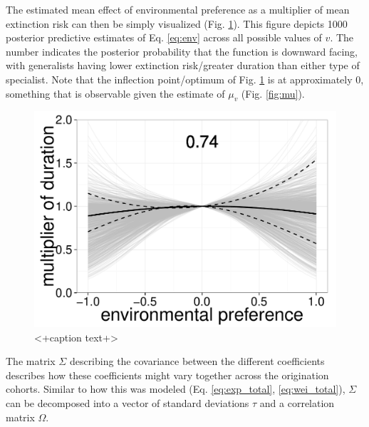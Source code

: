 \documentclass[12pt,letterpaper]{article}
\begin{document}
The estimated mean effect of environmental preference as a multiplier of mean extinction risk can then be simply visualized (Fig. \ref{fig:env_mean}). This figure depicts 1000 posterior predictive estimates of Eq. \ref{eq:env} across all possible values of \(v\). The number indicates the posterior probability that the function is downward facing, with generalists having lower extinction risk/greater duration than either type of specialist. Note that the inflection point/optimum of Fig. \ref{fig:env_mean} is at approximately 0, something that is observable given the estimate of \(\mu_{v}\) (Fig. \ref{fig:mu}).
\begin{figure}[ht]
  \centering
  \includegraphics[height = 0.5\textheight,width=\textwidth,keepaspectratio=true]{figure/environ_quad}
  \caption{<+caption text+>}
  \label{fig:env_mean}
\end{figure}

The matrix \(\Sigma\) describing the covariance between the different coefficients describes how these coefficients might vary together across the origination cohorts. Similar to how this was modeled (Eq. \ref{eq:exp_total}, \ref{eq:wei_total}), \(\Sigma\) can be decomposed into a vector of standard deviations \(\tau\) and a correlation matrix \(\Omega\).
\end{document}
